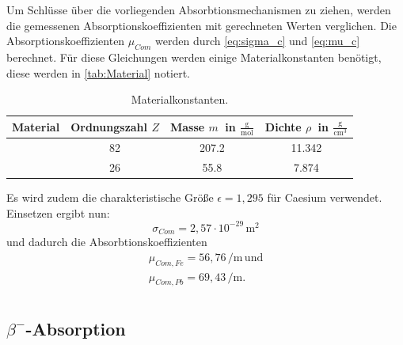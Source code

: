 Um Schlüsse über die vorliegenden Absorbtionsmechanismen zu ziehen, werden die gemessenen Absorptionskoeffizienten
mit gerechneten Werten verglichen. Die Absorptionskoeffizienten $\mu_{Com}$ werden durch \autoref{eq:sigma_c} und
\autoref{eq:mu_c} berechnet.
Für diese Gleichungen werden einige Materialkonstanten benötigt, diese werden in \autoref{tab:Material} notiert.
\begin{table}
  \centering
  \begin{tabular}{S S[table-format=2.0] S[table-format=3.1] S[table-format=2.3]}
    \toprule
    {Material} & {Ordnungszahl $Z$} & {Masse $m\:$ in $\frac{\si\gram}{\si\mol}$} & {Dichte $\rho\:$ in $\frac{\si\gram}{\si{\centi\meter}^3}$}\\
    \midrule
     & 82 & 207.2 & 11.342\\
     &26 & 55.8  & 7.874\\
    \bottomrule
  \end{tabular}
  \caption{Materialkonstanten.}
  \label{tab:Material}
\end{table}
Es wird zudem die charakteristische Größe $\epsilon = 1,295$ für Caesium verwendet.
Einsetzen ergibt nun:
\begin{equation*}
  \sigma_{Com} = 2,57 \cdot 10^{-29} \, \mathrm{m}^2
\end{equation*}
und dadurch die Absorbtionskoeffizienten
\begin{align*}
  \mu_{Com,Fe} = 56,76 \, \si{\per\meter} \, \mathrm{und} \\
  \mu_{Com,Pb} = 69,43 \, \si{\per\meter}. \\
\end{align*}

\subsection{\texorpdfstring{$\beta^-$}{Beta}-Absorption}

